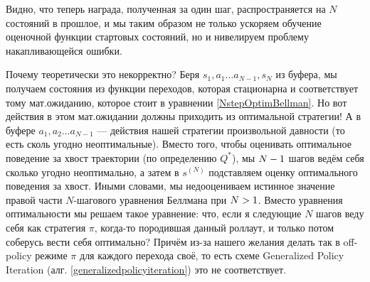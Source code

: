 Видно, что теперь награда, полученная за один шаг, распространяется на $N$ состояний в прошлое, и мы таким образом не только ускоряем обучение оценочной функции стартовых состояний, но и нивелируем проблему накапливающейся ошибки. 

Почему теоретически это некорректно? Беря $s_1, a_1 \dots a_{N-1}, s_N$ из буфера, мы получаем состояния из функции переходов, которая стационарна и соответствует тому мат.ожиданию, которое стоит в уравнении \eqref{NstepOptimBellman}. Но вот действия в этом мат.ожидании должны приходить из оптимальной стратегии! А в буфере $a_1, a_2 \dots a_{N-1}$ --- действия нашей стратегии произвольной давности (то есть сколь угодно неоптимальные). Вместо того, чтобы оценивать оптимальное поведение за хвост траектории (по определению $Q^*$), мы $N \HM- 1$ шагов ведём себя сколько угодно неоптимально, а затем в $s^{(N)}$ подставляем оценку оптимального поведения за хвост. Иными словами, мы недооцениваем истинное значение правой части $N$-шагового уравнения Беллмана при $N \HM> 1$. Вместо уравнения оптимальности мы решаем такое уравнение: что, если я следующие $N$ шагов веду себя как стратегия $\pi$, когда-то породившая данный роллаут, и только потом соберусь вести себя оптимально? Причём из-за нашего желания делать так в off-policy режиме $\pi$ для каждого перехода своё, то есть схеме Generalized Policy Iteration (алг. \ref{generalizedpolicyiteration}) это не соответствует.

